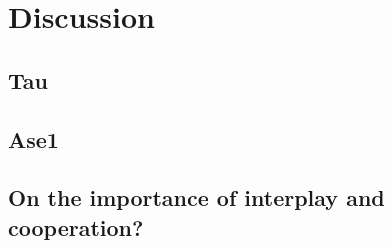 \chapter{Discussion}
\section{Tau}
%
\section{Ase1}


\section{On the importance of interplay and cooperation?}